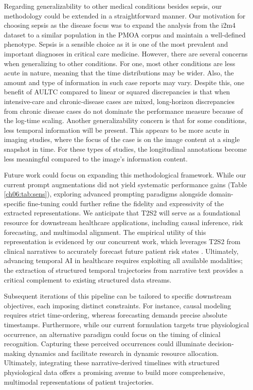 Regarding generalizability to other medical conditions besides sepsis, our methodology could be extended in a straightforward manner.
Our motivation for choosing sepsis as the disease focus was to expand the analysis from the i2m4 dataset to a similar population in the PMOA corpus and maintain a well-defined phenotype.
Sepsis is a sensible choice as it is one of the most prevalent and important diagnoses in critical care medicine.
However, there are several concerns when generalizing to other conditions.
For one, most other conditions are less acute in nature, meaning that the time distributions may be wider.
Also, the amount and type of information in such case reports may vary.
Despite this, one benefit of AULTC compared to linear or squared discrepancies is that when intensive-care and chronic-disease cases are mixed, long-horizon discrepancies from chronic disease cases do not dominate the performance measure because of the log-time scaling.
Another generalizability concern is that for some conditions, less temporal information will be present.
This appears to be more acute in imaging studies, where the focus of the case is on the image content at a single snapshot in time.
For these types of studies, the longitudinal annotations become less meaningful compared to the image's information content.

Future work could focus on expanding this methodological framework.
While our current prompt augmentations did not yield systematic performance gains (Table \ref{ch06:tab:sens}), exploring advanced prompting paradigms alongside domain-specific fine-tuning could further refine the fidelity and expressivity of the extracted representations.
We anticipate that T2S2 will serve as a foundational resource for downstream healthcare applications, including causal inference, risk forecasting, and multimodal alignment.
The empirical utility of this representation is evidenced by our concurrent work, which leverages T2S2 from clinical narratives to accurately forecast future patient risk states \citep{noroozizadeh2026forecasting}.
Ultimately, advancing temporal AI in healthcare requires exploiting all available modalities; the extraction of structured temporal trajectories from narrative text provides a critical complement to existing structured data streams.

Subsequent iterations of this pipeline can be tailored to specific downstream objectives, each imposing distinct constraints.
For instance, causal modeling requires strict time-ordering, whereas forecasting demands precise absolute timestamps.
Furthermore, while our current formulation targets true physiological occurrence, an alternative paradigm could focus on the timing of clinical recognition.
Capturing these perceived occurrences could illuminate decision-making dynamics and facilitate research in dynamic resource allocation.
Ultimately, integrating these narrative-derived timelines with structured physiological data offers a promising avenue to build more comprehensive, multimodal representations of patient trajectories.

